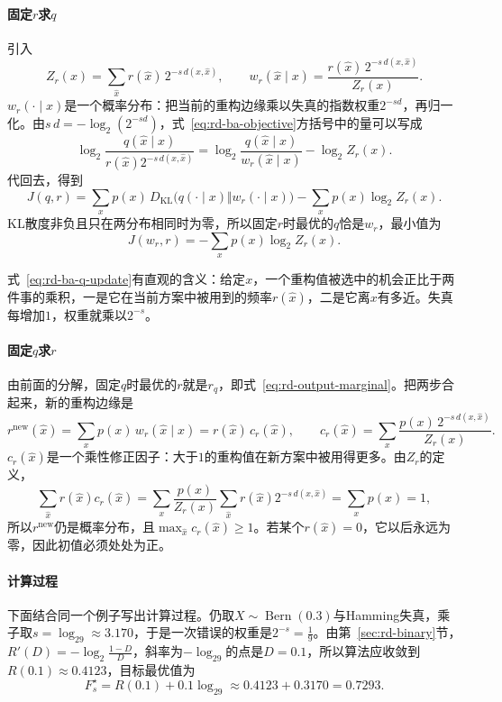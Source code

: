 \paragraph{固定$r$求$q$}
引入
\begin{equation}
  Z_r(x)=\sum_{\hat{x}}r(\hat{x})\,2^{-s\,d(x,\hat{x})},\qquad
  w_r(\hat{x}\mid x)=\frac{r(\hat{x})\,2^{-s\,d(x,\hat{x})}}{Z_r(x)}.
  \label{eq:rd-ba-q-update}
\end{equation}
$w_r(\cdot\mid x)$是一个概率分布：把当前的重构边缘乘以失真的指数权重$2^{-sd}$，再归一化。由$s\,d=-\log_2(2^{-sd})$，式~\eqref{eq:rd-ba-objective}方括号中的量可以写成
\[
  \log_2\frac{q(\hat{x}\mid x)}{r(\hat{x})2^{-s\,d(x,\hat{x})}}=\log_2\frac{q(\hat{x}\mid x)}{w_r(\hat{x}\mid x)}-\log_2Z_r(x).
\]
代回去，得到
\[
  J(q,r)=\sum_{x}p(x)\,D_{\mathrm{KL}}\bigl(q(\cdot\mid x)\Vert w_r(\cdot\mid x)\bigr)-\sum_{x}p(x)\log_2Z_r(x).
\]
KL散度非负且只在两分布相同时为零，所以固定$r$时最优的$q$恰是$w_r$，最小值为
\begin{equation}
  J(w_r,r)=-\sum_{x}p(x)\log_2Z_r(x).
  \label{eq:rd-ba-j-value}
\end{equation}

式~\eqref{eq:rd-ba-q-update}有直观的含义：给定$x$，一个重构值被选中的机会正比于两件事的乘积，一是它在当前方案中被用到的频率$r(\hat{x})$，二是它离$x$有多近。失真每增加$1$，权重就乘以$2^{-s}$。

\paragraph{固定$q$求$r$}
由前面的分解，固定$q$时最优的$r$就是$r_q$，即式~\eqref{eq:rd-output-marginal}。把两步合起来，新的重构边缘是
\begin{equation}
  r^{\mathrm{new}}(\hat{x})=\sum_{x}p(x)\,w_r(\hat{x}\mid x)=r(\hat{x})\,c_r(\hat{x}),\qquad
  c_r(\hat{x})=\sum_{x}\frac{p(x)\,2^{-s\,d(x,\hat{x})}}{Z_r(x)} .
  \label{eq:rd-ba-r-update}
\end{equation}
$c_r(\hat{x})$是一个乘性修正因子：大于$1$的重构值在新方案中被用得更多。由$Z_r$的定义，
\[
  \sum_{\hat{x}}r(\hat{x})c_r(\hat{x})=\sum_{x}\frac{p(x)}{Z_r(x)}\sum_{\hat{x}}r(\hat{x})2^{-s\,d(x,\hat{x})}=\sum_xp(x)=1,
\]
所以$r^{\mathrm{new}}$仍是概率分布，且$\max_{\hat{x}}c_r(\hat{x})\geq1$。若某个$r(\hat{x})=0$，它以后永远为零，因此初值必须处处为正。

\paragraph{计算过程}
下面结合同一个例子写出计算过程。仍取$X\sim\operatorname{Bern}(0.3)$与Hamming失真，乘子取$s=\log_29\approx3.170$，于是一次错误的权重是$2^{-s}=\tfrac19$。由第~\ref{sec:rd-binary}节，$R'(D)=-\log_2\frac{1-D}{D}$，斜率为$-\log_29$的点是$D=0.1$，所以算法应收敛到$R(0.1)\approx0.4123$，目标最优值为
\[
  F_s^{\star}=R(0.1)+0.1\log_29\approx0.4123+0.3170=0.7293 .
\]

